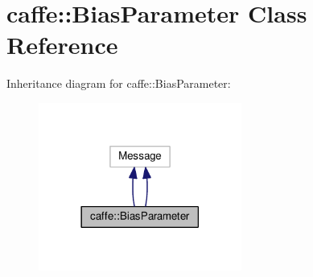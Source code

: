 \hypertarget{classcaffe_1_1_bias_parameter}{}\section{caffe\+:\+:Bias\+Parameter Class Reference}
\label{classcaffe_1_1_bias_parameter}


Inheritance diagram for caffe\+:\+:Bias\+Parameter\+:
\nopagebreak
\begin{figure}[H]
\begin{center}
\leavevmode
\includegraphics[width=189pt]{classcaffe_1_1_bias_parameter__inherit__graph}
\end{center}
\end{figure}
